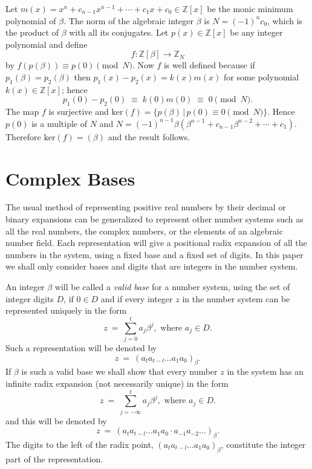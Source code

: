 \documentclass[12pt]{article}
\newcommand{\Z}{\mathbb{Z}}
\begin{document}
  Let $m(x) = x^n+c_{n-1}x^{n-1}+\cdots+c_1x+c_0\in\Z[x]$ be the monic
minimum polynomial of $\beta$.  The norm of the algebraic integer $\beta$ is $N = (-1)^nc_0$, which is the product of $\beta$ with all its conjugates. 
Let $p(x)\in\Z[x]$ be any integer polynomial and define
$$
f:\Z[\beta]\longrightarrow \Z_N
$$
by $f(p(\beta)) \equiv p(0) \pmod{N}$. 
Now $f$ is well defined because if $p_1(\beta) = p_2(\beta)$
then $p_1(x) - p_2(x) = k(x)m(x)$ for some polynomial $k(x)\in\Z[x]$; hence
$$
p_1(0) - p_2(0)\; \equiv \; k(0)m(0) \; \equiv \; 0 \pmod{N}.
$$
The map $f$ is surjective and $\mbox{ker}(f) = \{p(\beta)\,|\, p(0)\equiv  0 \pmod{N}\}$. Hence
$p(0)$ is a multiple of $N$ and $N =(-1)^{n-1}\beta(\beta^{n-1}+c_{n-1}\beta^{n-2}+\cdots +c_1)$.
Therefore $\mbox{ker}(f) = (\beta)$ and the result follows.                           \hspace*{\fill}\fbox{\phantom{:}}

\section{Complex Bases}

The usual method of representing positive real numbers by their decimal
or binary expansions can be generalized to represent other number systems
such as all the real numbers, the complex numbers, or the elements of an
algebraic number field.  Each representation will give a positional radix
expansion of all the numbers in the system, using a fixed base and a fixed
set of digits. In this paper we shall only consider bases and digits that are
integers in the number system.

An integer $\beta$ will be called a \emph{valid base} for a number system, using the
set of integer digits $D$, if $0 \in D$ and if every integer $z$ in the number system can be represented uniquely in the form
$$
z\ = \ \sum_{j=0}^t a_j\beta^j, \mbox{ where } a_j\in D.
$$
Such a representation will be denoted by
$$
z\ = \ (a_ta_{t-l}\ldots a_1a_0)_{\beta}.
$$
If $\beta$ is such a valid base we shall show that every number $z$ in the system has an infinite radix expansion (not necessarily unique) in the form
$$
z\ = \ \sum_{j=-\infty}^t a_j\beta^j, \mbox{ where } a_j\in D.
$$
and this will be denoted by
$$
z\ = \ (a_ta_{t-l}\ldots a_1a_0\cdot a_{-1}a_{-2}\ldots)_{\beta}.
$$
The digits to the left of the radix point, $(a_ta_{t-l}\ldots a_1a_0)_{\beta}$, constitute the integer part of the representation.
\end{document}
